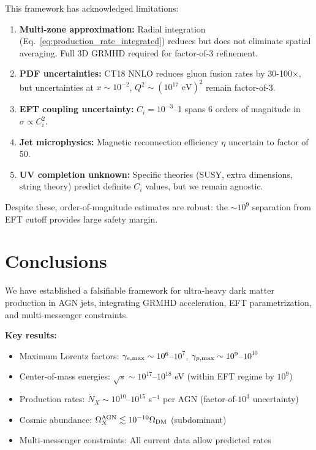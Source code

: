 \documentclass[twocolumn,superscriptaddress,prd,nofootinbib]{revtex4-2}
\begin{document}
This framework has acknowledged limitations:

\begin{enumerate}
\item \textbf{Multi-zone approximation:} Radial integration (Eq.~\ref{eq:production_rate_integrated}) reduces but does not eliminate spatial averaging. Full 3D GRMHD required for factor-of-3 refinement.

\item \textbf{PDF uncertainties:} CT18 NNLO reduces gluon fusion rates by 30-100$\times$, but uncertainties at $x \sim 10^{-2}$, $Q^2 \sim (10^{17} \text{ eV})^2$ remain factor-of-3.

\item \textbf{EFT coupling uncertainty:} $C_i = 10^{-3}$--1 spans 6 orders of magnitude in $\sigma \propto C_i^2$.

\item \textbf{Jet microphysics:} Magnetic reconnection efficiency $\eta$ uncertain to factor of 50.

\item \textbf{UV completion unknown:} Specific theories (SUSY, extra dimensions, string theory) predict definite $C_i$ values, but we remain agnostic.
\end{enumerate}

Despite these, order-of-magnitude estimates are robust: the $\sim 10^9$ separation from EFT cutoff provides large safety margin.

\section{Conclusions}
\label{sec:conclusions}

We have established a falsifiable framework for ultra-heavy dark matter production in AGN jets, integrating GRMHD acceleration, EFT parametrization, and multi-messenger constraints.

\textbf{Key results:}
\begin{itemize}
\item Maximum Lorentz factors: $\gamma_{e,\rm max} \sim 10^6$--$10^7$, $\gamma_{p,\rm max} \sim 10^9$--$10^{10}$
\item Center-of-mass energies: $\sqrt{s} \sim 10^{17}$--$10^{18}$ eV (within EFT regime by $10^9$)
\item Production rates: $\dot{N}_X \sim 10^{10}$--$10^{15}$ s$^{-1}$ per AGN (factor-of-$10^3$ uncertainty)
\item Cosmic abundance: $\Omega_X^{\rm AGN} \lesssim 10^{-10}\Omega_{\rm DM}$ (subdominant)
\item Multi-messenger constraints: All current data allow predicted rates
\end{itemize}
\end{document}
